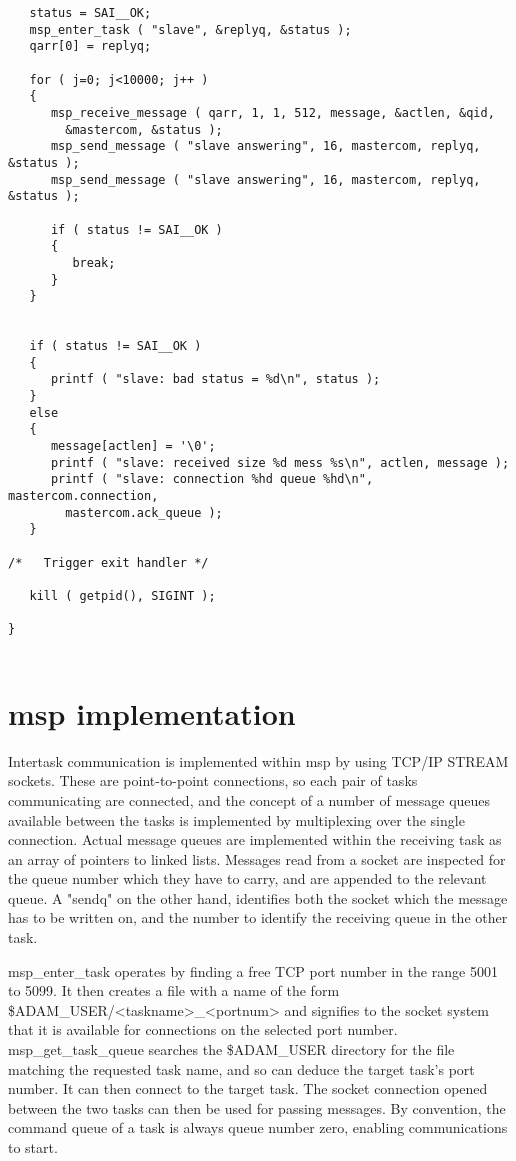 \begin{verbatim}
   status = SAI__OK;
   msp_enter_task ( "slave", &replyq, &status );
   qarr[0] = replyq;

   for ( j=0; j<10000; j++ )
   {
      msp_receive_message ( qarr, 1, 1, 512, message, &actlen, &qid,
        &mastercom, &status );
      msp_send_message ( "slave answering", 16, mastercom, replyq, &status );
      msp_send_message ( "slave answering", 16, mastercom, replyq, &status );

      if ( status != SAI__OK )
      {
         break;
      }
   }


   if ( status != SAI__OK )
   {
      printf ( "slave: bad status = %d\n", status );
   }
   else
   {
      message[actlen] = '\0';
      printf ( "slave: received size %d mess %s\n", actlen, message );
      printf ( "slave: connection %hd queue %hd\n", mastercom.connection,
        mastercom.ack_queue );
   }

/*   Trigger exit handler */

   kill ( getpid(), SIGINT );

}


\end{verbatim}



\section {msp implementation}

Intertask communication is implemented within msp by using TCP/IP STREAM
sockets. These are point-to-point connections, so each pair of tasks
communicating are connected, and the concept of a number of message
queues available between the tasks is implemented by multiplexing over
the single connection. Actual message queues are implemented within the
receiving task as an array of pointers to linked lists. Messages read
from a socket are inspected for the queue number which they have to
carry, and are appended to the relevant queue. A "sendq" on the other
hand, identifies both the socket which the message has to be written on,
and the number to identify the receiving queue in the other task.

msp\_enter\_task operates by finding a free TCP port number in the range
5001 to 5099. It then creates a file with a name of the form
\$ADAM\_USER/<taskname>\_<portnum> and signifies to the socket system that
it is available for connections on the selected port number.
msp\_get\_task\_queue searches the \$ADAM\_USER directory for the file
matching the requested task name, and so can deduce the target task's
port number. It can then connect to the target task. The socket
connection opened between the two tasks can then be used for passing
messages. By convention, the command queue of a task is always queue
number zero, enabling communications to start.

